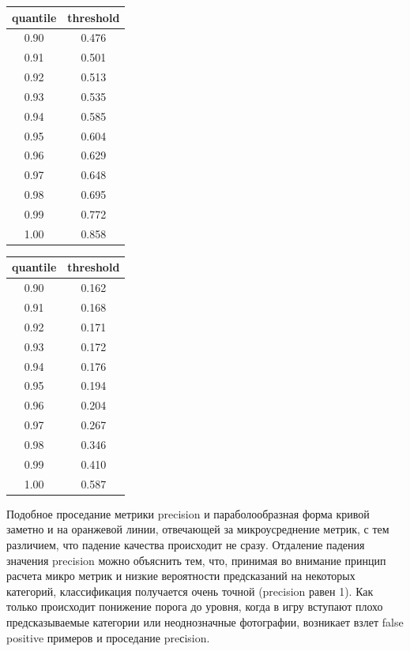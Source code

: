\documentclass[a4paper,12pt]{extarticle}
\begin{document}
\begin{table}[ht]
	\footnotesize
	\begin{minipage}[t]{0.5\textwidth}
	\centering
	\begin{tabular}{cc}
		\toprule
		\multicolumn{1}{c}{quantile} & \multicolumn{1}{c}{threshold}\\
		\midrule
		0.90 & 0.476\\
		0.91 & 0.501\\
		0.92 & 0.513\\
		0.93 & 0.535\\
		0.94 & 0.585\\
		0.95 & 0.604\\
		0.96 & 0.629\\
		0.97 & 0.648\\
		0.98 & 0.695\\
		0.99 & 0.772\\
		1.00 & 0.858\\
		\bottomrule
	\end{tabular}
	\label{table:quantile_shoes}
	\end{minipage}
	\begin{minipage}[t]{0.5\textwidth}
	\centering
	\begin{tabular}{cc}
		\toprule
		\multicolumn{1}{c}{quantile} & \multicolumn{1}{c}{threshold}\\
		\midrule
		0.90 & 0.162\\
		0.91 & 0.168\\
		0.92 & 0.171\\
		0.93 & 0.172\\
		0.94 & 0.176\\
		0.95 & 0.194\\
		0.96 & 0.204\\
		0.97 & 0.267\\
		0.98 & 0.346\\
		0.99 & 0.410\\
		1.00 & 0.587\\
		\bottomrule
	\end{tabular}
	\label{table:quantile_shoescat2}
	\end{minipage}
\end{table}

Подобное проседание метрики precision и параболообразная форма кривой заметно и на оранжевой линии, отвечающей за микроусреднение метрик, с тем различием, что падение качества происходит не сразу. Отдаление падения значения precision можно объяснить тем, что, принимая во внимание принцип расчета микро метрик и низкие вероятности предсказаний на некоторых категорий, классификация получается очень точной (precision равен 1). Как только происходит понижение порога до уровня, когда в игру вступают плохо предсказываемые категории или неоднозначные фотографии, возникает взлет false positive примеров и проседание preсision.
\end{document}
